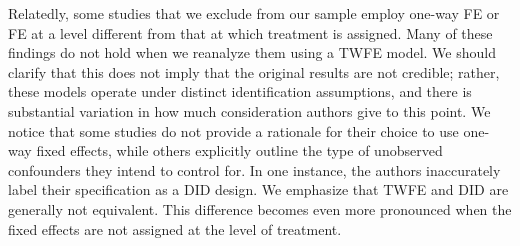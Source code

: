 \documentclass[12pt]{article}
\begin{document}
Relatedly, some studies that we exclude from our sample employ one-way FE or FE at a level different from that at which treatment is assigned. Many of these findings do not hold when we reanalyze them using a TWFE model. We should clarify that this does not imply that the original results are not credible; rather, these models operate under distinct identification assumptions, and there is substantial variation in how much consideration authors give to this point. We notice that some studies do not provide a rationale for their choice to use one-way fixed effects, while others explicitly outline the type of unobserved confounders they intend to control for. In one instance, the authors inaccurately label their specification as a DID design. We emphasize that TWFE and DID are generally not equivalent. This difference becomes even more pronounced when the fixed effects are not assigned at the level of treatment. 




\FloatBarrier
\end{document}

